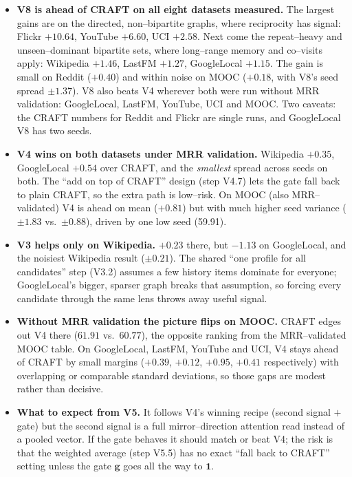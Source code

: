 \documentclass[11pt]{article}
\begin{document}
\begin{itemize}[nosep]
  \item \textbf{V8 is ahead of CRAFT on all eight datasets measured.} The largest
        gains are on the directed, non--bipartite graphs, where reciprocity has
        signal: Flickr $+10.64$, YouTube $+6.60$, UCI $+2.58$. Next come the
        repeat--heavy and unseen--dominant bipartite sets, where long--range
        memory and co--visits apply: Wikipedia $+1.46$, LastFM $+1.27$,
        GoogleLocal $+1.15$. The gain is small on Reddit ($+0.40$) and within
        noise on MOOC ($+0.18$, with V8's seed spread $\pm1.37$). V8 also beats V4
        wherever both were run without MRR validation: GoogleLocal, LastFM,
        YouTube, UCI and MOOC. Two caveats: the CRAFT numbers for Reddit and
        Flickr are single runs, and GoogleLocal V8 has two seeds.
  \item \textbf{V4 wins on both datasets under MRR validation.} Wikipedia $+0.35$, GoogleLocal
        $+0.54$ over CRAFT, and the \emph{smallest} spread across seeds on both.
        The ``add on top of CRAFT'' design (step V4.7) lets the gate fall back to
        plain CRAFT, so the extra path is low--risk. On MOOC (also MRR--validated)
        V4 is ahead on mean ($+0.81$) but with much higher seed variance ($\pm1.83$
        vs.\ $\pm0.88$), driven by one low seed (59.91).
  \item \textbf{V3 helps only on Wikipedia.} $+0.23$ there, but $-1.13$ on
        GoogleLocal, and the noisiest Wikipedia result ($\pm0.21$). The shared
        ``one profile for all candidates'' step (V3.2) assumes a few history
        items dominate for everyone; GoogleLocal's bigger, sparser graph breaks
        that assumption, so forcing every candidate through the same lens throws
        away useful signal.
  \item \textbf{Without MRR validation the picture flips on MOOC.} CRAFT edges
        out V4 there ($61.91$ vs.\ $60.77$), the opposite ranking from the
        MRR--validated MOOC table. On GoogleLocal, LastFM, YouTube and UCI, V4
        stays ahead of CRAFT by small margins ($+0.39$, $+0.12$, $+0.95$, $+0.41$
        respectively) with overlapping or comparable standard deviations, so
        those gaps are modest rather than decisive.
  \item \textbf{What to expect from V5.} It follows V4's winning recipe (second
        signal $+$ gate) but the second signal is a full mirror--direction
        attention read instead of a pooled vector. If the gate behaves it should
        match or beat V4; the risk is that the weighted average (step V5.5) has
        no exact ``fall back to CRAFT'' setting unless the gate $\bm{g}$ goes all
        the way to $\bm{1}$.
\end{itemize}
\end{document}
